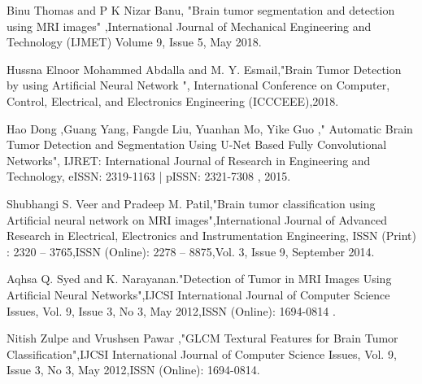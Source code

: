 \documentclass[10pt, oneside]{Thesis} %
\begin{document}
% 
\begin{thebibliography}{99}

Binu Thomas and P K Nizar Banu, "Brain tumor segmentation and detection using MRI images" ,International Journal of Mechanical Engineering and Technology (IJMET) Volume 9, Issue 5, May 2018.

Hussna Elnoor Mohammed Abdalla and M. Y. Esmail,"Brain Tumor Detection by using Artificial Neural Network ",  International Conference on Computer, Control, Electrical, and Electronics Engineering (ICCCEEE),2018.

Hao Dong ,Guang Yang, Fangde Liu, Yuanhan Mo, Yike Guo ,"  Automatic Brain Tumor Detection and Segmentation Using U-Net Based Fully Convolutional Networks", IJRET: International Journal of Research in Engineering and Technology, eISSN: 2319-1163 | pISSN: 2321-7308 , 2015.

Shubhangi S. Veer and Pradeep M. Patil,"Brain tumor classification using Artificial neural network on MRI images",International Journal of Advanced Research in  Electrical, Electronics and Instrumentation Engineering, ISSN (Print)  : 2320 – 3765,ISSN (Online): 2278 – 8875,Vol. 3, Issue 9, September 2014.

Aqhsa Q. Syed and K. Narayanan."Detection of Tumor in MRI Images Using Artificial Neural Networks",IJCSI International Journal of Computer Science Issues, Vol. 9, Issue 3, No 3, May 2012,ISSN (Online): 1694-0814 .

Nitish Zulpe and Vrushsen Pawar
,"GLCM Textural Features for Brain Tumor Classification",IJCSI International Journal of Computer Science Issues, Vol. 9, Issue 3, No 3, May 2012,ISSN (Online): 1694-0814.

\end{thebibliography}
\end{document}
